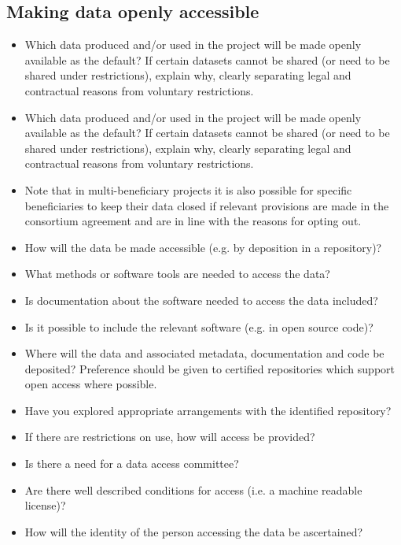 \documentclass{article}
\begin{document}
\subsection{Making data openly accessible}
\begin{itemize}
    \item Which data produced and/or used in the project will be made openly available as the default? If certain datasets cannot be shared (or need to be shared under restrictions), explain why, clearly separating legal and contractual reasons from voluntary restrictions.
    \item Which data produced and/or used in the project will be made openly available as the default? If certain datasets cannot be shared (or need to be shared under restrictions), explain why, clearly separating legal and contractual reasons from voluntary restrictions.
    \item Note that in multi-beneficiary projects it is also possible for specific beneficiaries to keep their data closed if relevant provisions are made in the consortium agreement and are in line with the reasons for opting out.
    \item How will the data be made accessible (e.g. by deposition in a repository)?
    \item What methods or software tools are needed to access the data?
    \item Is documentation about the software needed to access the data included?
    \item Is it possible to include the relevant software (e.g. in open source code)?
    \item Where will the data and associated metadata, documentation and code be deposited? Preference should be given to certified repositories which support open access where possible.
    \item Have you explored appropriate arrangements with the identified repository?
    \item If there are restrictions on use, how will access be provided?
    \item Is there a need for a data access committee?
    \item Are there well described conditions for access (i.e. a machine readable license)?
    \item How will the identity of the person accessing the data be ascertained?
\end{itemize}
\end{document}
